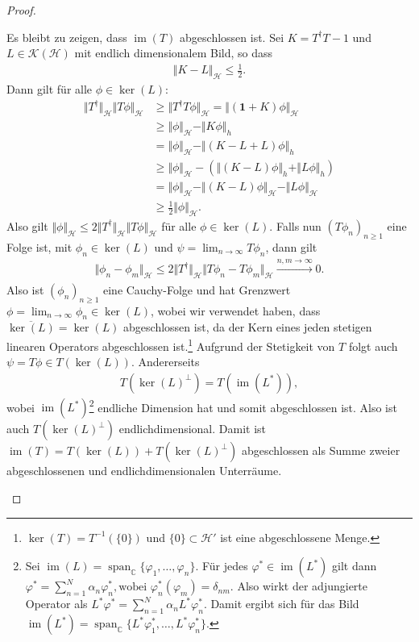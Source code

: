 \documentclass[11pt, hidelinks]{article}
\newcommand{\h}{\mathcal{H}}
\newcommand{\im}{\operatorname{im}}
\numberwithin{conj}{section}
\begin{document}
\begin{proof}
\begin{itemize}
    Es bleibt zu zeigen, dass $\im(T)$ abgeschlossen ist. Sei $K = T^\dagger T - 1$ und $L \in \mathcal{K}(\h)$ mit endlich dimensionalem Bild, so dass
    \begin{align}
        \Vert K-L \Vert_\h \leq \frac{1}{2}.
    \end{align}
    Dann gilt für alle $\phi \in \ker(L)$:
    \begin{align}
        \Vert T^\dagger \Vert_\h \Vert T\phi \Vert_\h &\geq \Vert T^\dagger T \phi \Vert_\h = \Vert (\mathbf{1}+K)\phi \Vert_\h \\
        &\geq \Vert \phi \Vert_\h - \Vert K \phi \Vert_h \\
        &= \Vert \phi \Vert_\h - \Vert (K-L+L) \phi \Vert_h \\
        &\geq \Vert \phi \Vert_\h - (\Vert (K-L) \phi \Vert_h + \Vert L \phi \Vert_h) \\
        &= \Vert \phi \Vert_\h - \Vert (K-L)\phi \Vert_\h - \Vert L \phi \Vert_\h \\
        &\geq \frac{1}{2} \Vert \phi \Vert_\h.
    \end{align}
    Also gilt $\Vert \phi \Vert_\h \leq 2 \Vert T^\dagger \Vert_\h \Vert T\phi \Vert_\h$ für alle $\phi \in \ker(L)$. Falls nun $(T\phi_n)_{n \geq 1}$ eine Folge ist, mit $\phi_n \in \ker(L)$ und $\psi = \lim_{n \to \infty} T\phi_n$, dann gilt
    \begin{align}
        \Vert \phi_n - \phi_m \Vert_\h \leq 2 \Vert T^\dagger \Vert_\h \Vert T\phi_n - T\phi_m \Vert_\h \xrightarrow[]{n,m \to \infty} 0.
    \end{align}
    Also ist $(\phi_n)_{n \geq 1}$ eine Cauchy-Folge und hat Grenzwert $\phi = \lim_{n \to \infty} \phi_n \in \ker(L)$, wobei wir verwendet haben, dass $\overline{\ker(L)} = \ker(L)$ abgeschlossen ist, da der Kern eines jeden stetigen linearen Operators abgeschlossen ist.\footnote{$\ker(T) = T^{-1}(\{0\})$ und $\{0\} \subset \h'$ ist eine abgeschlossene Menge.} Aufgrund der Stetigkeit von $T$ folgt auch $\psi = T\phi \in T(\ker(L))$. Andererseits
    \begin{align}
        T(\ker(L)^\perp) = T(\im(L^\ast)),
    \end{align}
    wobei $\im(L^\ast)$\footnote{Sei $\im(L) = \operatorname{span}_\mathbb{C}\{\varphi_1, \dots, \varphi_n\}$. Für jedes \( \varphi^\ast \in \im(L^\ast) \) gilt dann $\varphi^\ast = \sum_{n=1}^N \alpha_n \varphi_n^\ast, \text{wobei } \varphi_n^\ast(\varphi_m) = \delta_{nm}$. Also wirkt der adjungierte Operator als $L^\ast \varphi^\ast = \sum_{n=1}^N \alpha_n L^\ast \varphi_n^\ast$. Damit ergibt sich für das Bild \( \im(L^\ast) = \operatorname{span}_{\mathbb{C}}\{L^\ast \varphi_1^\ast, \dots, L^\ast \varphi_n^\ast\} \).} endliche Dimension hat und somit abgeschlossen ist. Also ist auch $T(\ker(L)^\perp)$ endlichdimensional. Damit ist $\im(T) = T(\ker(L)) + T(\ker(L)^\perp)$ abgeschlossen als Summe zweier abgeschlossenen und endlichdimensionalen Unterräume.
\end{itemize}
\end{proof}
\end{document}
